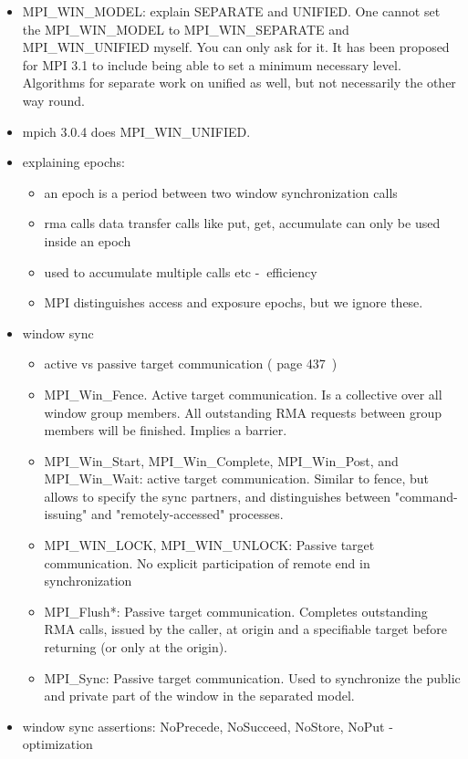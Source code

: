 \documentclass[a4paper, 10pt]{article}
\begin{document}
\begin{enumerate}
\begin{itemize}
\begin{itemize}
			\item MPI\_WIN\_MODEL: explain SEPARATE and UNIFIED. One cannot set the MPI\_WIN\_MODEL to MPI\_WIN\_SEPARATE and MPI\_WIN\_UNIFIED myself. You can only ask for it. It has been proposed for MPI 3.1 to include being able to set a minimum necessary level. Algorithms for separate work on unified as well, but not necessarily the other way round.
			\item mpich 3.0.4 does MPI\_WIN\_UNIFIED.
			\item explaining epochs:
				\begin{itemize}
					\item an epoch is a period between two window synchronization calls
					\item rma calls data transfer calls like put, get, accumulate can only be used inside an epoch
					\item used to accumulate multiple calls etc -$\>$ efficiency
					\item MPI distinguishes access and exposure epochs, but we ignore these.
				\end{itemize}
			\item window sync
				\begin{itemize}
					\item active vs passive target communication (\cite{mpi3} page 437~)
					\item MPI\_Win\_Fence. Active target communication. Is a collective over all window group members. All outstanding RMA requests between group members will be finished. Implies a barrier.
					\item MPI\_Win\_Start, MPI\_Win\_Complete, MPI\_Win\_Post, and MPI\_Win\_Wait: active target communication. Similar to fence, but allows to specify the sync partners, and distinguishes between "command-issuing" and "remotely-accessed" processes.
					\item MPI\_WIN\_LOCK, MPI\_WIN\_UNLOCK: Passive target communication. No explicit participation of remote end in synchronization
					\item MPI\_Flush*: Passive target communication. Completes outstanding RMA calls, issued by the caller, at origin and a specifiable target before returning (or only at the origin).
					\item MPI\_Sync: Passive target communication. Used to synchronize the public and private part of the window in the separated model.
				\end{itemize}
			\item window sync assertions: NoPrecede, NoSucceed, NoStore, NoPut -$\>$ optimization

\end{itemize}
\end{itemize}
\end{enumerate}
\end{document}
